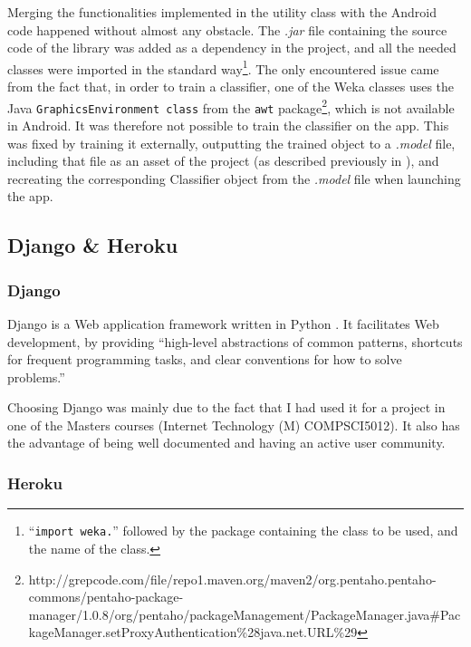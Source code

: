 \documentclass{mproj}
\begin{document}
Merging the functionalities implemented in the utility class with the Android code happened without almost any obstacle. The \textit{.jar} file containing the source code of the library was added as a dependency in the project, and all the needed classes were imported in the standard way\footnote{``\texttt{import weka.}'' followed by the package containing the class to be used, and the name of the class.}. The only encountered issue came from the fact that, in order to train a classifier, one of the Weka classes uses the Java \verb|GraphicsEnvironment class| from the \verb|awt| package\footnote{http://grepcode.com/file/repo1.maven.org/maven2/org.pentaho.pentaho-commons/pentaho-package-manager/1.0.8/org/pentaho/packageManagement/PackageManager.java\#PackageManager.setProxyAuthentication\%28java.net.URL\%29}, which is not available in Android. It was therefore not possible to train the classifier on the app. This was fixed by training it externally, outputting the trained object to a \textit{.model} file, including that file as an asset of the project (as described previously in ), and recreating the corresponding Classifier object from the \textit{.model} file when launching the app.

\subsection{Django \& Heroku}

\subsubsection*{Django}

Django is a Web application framework written in Python \cite{django}. It facilitates Web development, by providing ``high-level abstractions of common patterns, shortcuts for frequent programming tasks, and clear conventions for how to solve problems.'' \cite{djangobook}

Choosing Django was mainly due to the fact that I had used it for a project in one of the Masters courses (Internet Technology (M) COMPSCI5012). It also has the advantage of being well documented and having an active user community.\par

\subsubsection*{Heroku}
\end{document}
